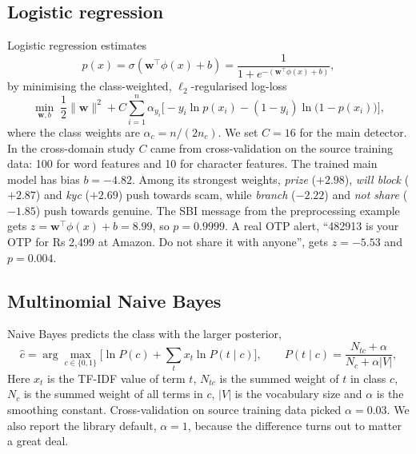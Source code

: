 \subsection{Logistic regression}
Logistic regression estimates
\begin{equation}
p(x)=\sigma\!\left(\mathbf{w}^{\top}\phi(x)+b\right)=\frac{1}{1+e^{-(\mathbf{w}^{\top}\phi(x)+b)}},
\end{equation}
by minimising the class-weighted, $\ell_2$-regularised log-loss
\begin{equation}
\min_{\mathbf{w},b}\;\frac{1}{2}\|\mathbf{w}\|^2 + C\sum_{i=1}^{n}\alpha_{y_i}\Big[-y_i\ln p(x_i)-(1-y_i)\ln\big(1-p(x_i)\big)\Big],
\end{equation}
where the class weights are $\alpha_c=n/(2n_c)$. We set $C=16$ for the main detector. In the cross-domain study $C$ came from cross-validation on the source training data: 100 for word features and 10 for character features. The trained main model has bias $b=-4.82$. Among its strongest weights, \textit{prize} ($+2.98$), \textit{will block} ($+2.87$) and \textit{kyc} ($+2.69$) push towards scam, while \textit{branch} ($-2.22$) and \textit{not share} ($-1.85$) push towards genuine. The SBI message from the preprocessing example gets $z=\mathbf{w}^\top\phi(x)+b=8.99$, so $p=0.9999$. A real OTP alert, ``482913 is your OTP for Rs 2,499 at Amazon. Do not share it with anyone'', gets $z=-5.53$ and $p=0.004$.

\subsection{Multinomial Naive Bayes}
Naive Bayes predicts the class with the larger posterior,
\begin{equation}
\hat{c}=\arg\max_{c\in\{0,1\}}\Big[\ln P(c)+\sum_{t} x_t \ln P(t\mid c)\Big],\qquad P(t\mid c)=\frac{N_{tc}+\alpha}{N_c+\alpha|V|},
\end{equation}
Here $x_t$ is the TF-IDF value of term $t$, $N_{tc}$ is the summed weight of $t$ in class $c$, $N_c$ is the summed weight of all terms in $c$, $|V|$ is the vocabulary size and $\alpha$ is the smoothing constant. Cross-validation on source training data picked $\alpha=0.03$. We also report the library default, $\alpha=1$, because the difference turns out to matter a great deal.

